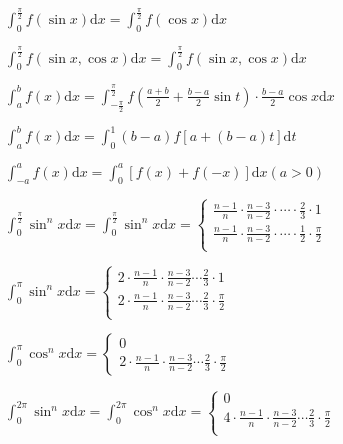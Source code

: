 \begin{spacing}{3}
    \noindent $\displaystyle \int_{0}^{\frac{\pi}{2}}{f(\sin{x})}\mathrm{d}x = \int_{0}^{\frac{\pi}{2}}{f(\cos{x})}\mathrm{d}x $

    \noindent $\displaystyle \int_{0}^{\frac{\pi}{2}}{f(\sin{x}, \cos{x})}\mathrm{d}x = \int_{0}^{\frac{\pi}{2}}{f(\sin{x}, \cos{x})}\mathrm{d}x $

    \noindent $\displaystyle \int_{a}^{b}{f(x)}\mathrm{d}x = \int_{-\frac{\pi}{2}}^{\frac{\pi}{2}}{f(\frac{a + b}{2} + \frac{b - a}{2}\sin{t}) \cdot \frac{b - a}{2}\cos{x}}\mathrm{d}x$

    \noindent $\displaystyle \int_{a}^{b}{f(x)}\mathrm{d}x = \int_{0}^{1}(b - a)f[a + (b - a)t]\mathrm{d}t$

    \noindent $\displaystyle \int_{-a}^{a}{f(x)}\mathrm{d}x = \int_{0}^{a}[f(x) + f(-x)]\mathrm{d}x (a > 0)$

    \noindent $\displaystyle \int_{0}^{\frac{\pi}{2}}{\sin^n{x}}\mathrm{d}x = \int_{0}^{\frac{\pi}{2}}{\sin^n{x}}\mathrm{d}x = \left\{ \begin{array}{l}
        \frac{n - 1}{n} \cdot \frac{n - 3}{n - 2} \cdot \cdots  \cdot \frac{2}{3} \cdot 1 \\
        \frac{n - 1}{n} \cdot \frac{n - 3}{n - 2} \cdot \cdots  \cdot \frac{1}{2} \cdot \frac{\pi}{2} \\
    \end{array}\right.$

    \noindent $\displaystyle \int_{0}^{\pi}{\sin^n{x}}\mathrm{d}x = \left\{ \begin{array}{l}
        2 \cdot \frac{n - 1}{n} \cdot \frac{n - 3}{n - 2} \cdots \frac{2}{3} \cdot 1 \\
        2 \cdot \frac{n - 1}{n} \cdot \frac{n - 3}{n - 2} \cdots \frac{2}{3} \cdot \frac{\pi}{2} \\
    \end{array}\right.$

    \noindent $\displaystyle \int_{0}^{\pi}{\cos^n{x}}\mathrm{d}x = \left\{ \begin{array}{l}
        0 \\
        2 \cdot \frac{n - 1}{n} \cdot \frac{n - 3}{n - 2} \cdots \frac{2}{3} \cdot \frac{\pi}{2}
    \end{array}\right.$

    \noindent $\displaystyle \int_{0}^{2\pi}{\sin^n{x}}\mathrm{d}x = \int_{0}^{2\pi}{\cos^n{x}}\mathrm{d}x =
        \left\{ \begin{array}{l}
        0 \\
        4 \cdot \frac{n - 1}{n} \cdot \frac{n - 3}{n - 2} \cdots \frac{2}{3} \cdot \frac{\pi}{2} \\
    \end{array}\right. $
\end{spacing}
